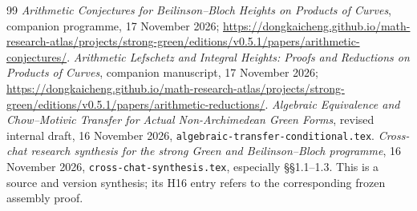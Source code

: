 \documentclass[11pt]{article}
\theoremstyle{definition}
\numberwithin{equation}{section}
\begin{document}
\begin{thebibliography}{99}
 \emph{Arithmetic Conjectures for Beilinson--Bloch Heights on Products of Curves}, companion programme, 17 November 2026; \url{https://dongkaicheng.github.io/math-research-atlas/projects/strong-green/editions/v0.5.1/papers/arithmetic-conjectures/}.
 \emph{Arithmetic Lefschetz and Integral Heights: Proofs and Reductions on Products of Curves}, companion manuscript, 17 November 2026; \url{https://dongkaicheng.github.io/math-research-atlas/projects/strong-green/editions/v0.5.1/papers/arithmetic-reductions/}.
 \emph{Algebraic Equivalence and Chow--Motivic Transfer for Actual Non-Archimedean Green Forms}, revised internal draft, 16 November 2026, \texttt{algebraic-transfer-conditional.tex}.
 \emph{Cross-chat research synthesis for the strong Green and Beilinson--Bloch programme}, 16 November 2026, \texttt{cross-chat-synthesis.tex}, especially \S\S1.1--1.3. This is a source and version synthesis; its H16 entry refers to the corresponding frozen assembly proof.
\end{thebibliography}
\end{document}
